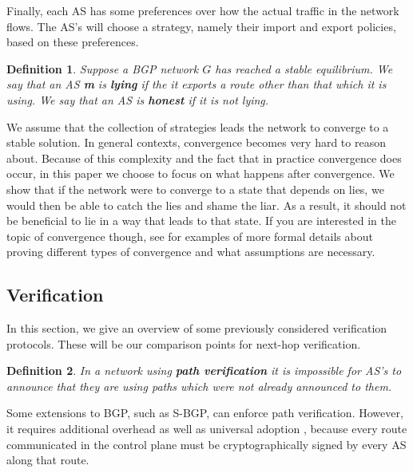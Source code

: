 \documentclass[10pt]{article}
\newtheorem{definition}{Definition}
\begin{document}
    Finally, each AS has some preferences over how the actual traffic in the
    network flows. The AS's will choose a strategy, namely their import and export
    policies, based on these preferences.

    \begin{definition}
      Suppose a BGP network $G$ has reached a stable equilibrium.
      We say that an AS \textbf{m} is \textbf{lying} if the
      it exports a route other than that which it is using.
      We say that an AS is \textbf{honest} if it is not lying.
    \end{definition}
    
    We assume that the collection of strategies leads the network to converge to a
    stable solution.
    In general contexts, convergence becomes very hard to
    reason about. Because of this complexity and the fact that in practice convergence does occur,
    in this paper we choose to focus on what happens after
    convergence. We show that if the network were to converge to a state that
    depends on lies, we would then be able to catch the lies and shame the liar.
    As a result, it should not be beneficial to lie in a way that leads to that
    state.
    If you are interested in the topic of convergence though, see
    \cite{RoutingGames, Attraction, StablePaths, PolicyPathVector}
    for examples of more formal details about proving different types of convergence
    and what assumptions are necessary.


  \subsection{Verification}
    In this section, we give an overview of some previously considered 
    verification protocols. These will be our comparison points for next-hop
    verification.

    \begin{definition} 
      In a network using \textbf{path verification} it is
      impossible for AS's to announce that they are using paths which were not
      already announced to them.
    \end{definition}

    Some extensions to BGP, such as S-BGP, can enforce path verification.
    However, it requires additional overhead as well as universal adoption
    \cite{PartialDeploy}, because every route communicated in the control plane
    must be cryptographically signed by every AS along that route.
\end{document}
